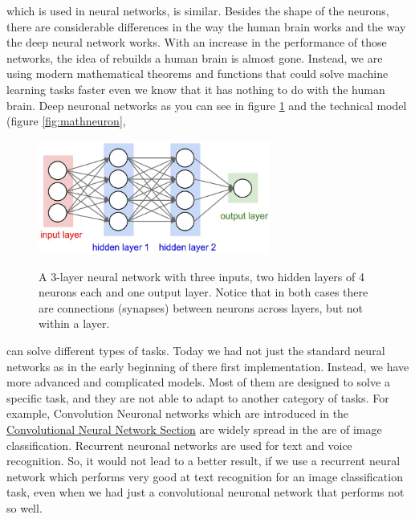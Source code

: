 \documentclass[journal]{IEEEtran}
\begin{document}
which is used in neural networks, is similar. Besides the shape of the neurons, there are considerable differences in the way the human brain works and the way the deep neural network works. With an increase in the performance of those networks, the idea of rebuilds a human brain is almost gone. Instead, we are using modern mathematical theorems and functions that could solve machine learning tasks faster even we know that it has nothing to do with the human brain. Deep neuronal networks as you can see in figure \ref{fig:neural-network}
and the technical model (figure \ref{fig:mathneuron},
\begin{figure}
  \begin{center}
  \includegraphics[width=3in]{photo/neural-network}\\
  \caption{A 3-layer neural network with three inputs, two hidden layers of 4 neurons each and one output layer. Notice that in both cases there are connections (synapses) between neurons across layers, but not within a layer.}
  \label{fig:neural-network}
  \end{center}
\end{figure}
 can solve different types of tasks. Today we had not just the standard neural networks as in the early beginning of there first implementation. Instead, we have more advanced and complicated models. Most of them are designed to solve a specific task, and they are not able to adapt to another category of tasks. For example, Convolution Neuronal networks which are introduced in the \hyperref[subsec:cnn]{Convolutional Neural Network Section} are widely spread in the are of image classification. Recurrent neuronal networks are used for text and voice recognition. So, it would not lead to a better result, if we use a recurrent neural network which performs very good at text recognition for an image classification task, even when we had just a convolutional neuronal network that performs not so well.
\end{document}
